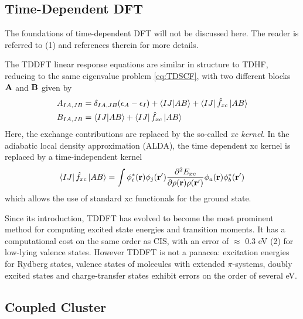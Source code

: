 \subsection{Time-Dependent DFT}

The foundations of time-dependent DFT  will not be discussed here. The reader is referred to (1) and references therein for more details. 

The TDDFT linear response equations are similar in structure to TDHF, reducing to the same eigenvalue problem \ref{eq:TDSCF}, with two different blocks $\mathbf{A}$ and $\mathbf{B}$ given by
\begin{align}
A_{IA,JB} &= \delta_{IA,JB} (\epsilon_A - \epsilon_I) + \bra{\smash{IJ}}\ket{\smash{AB}} +  \bra{\smash{IJ}}\hat{f}_{xc} \ket{\smash{AB}}  \\
B_{IA,JB} &= \bra{\smash{IJ}}\ket{\smash{AB}} + \bra{\smash{IJ}}\hat{f}_{xc} \ket{\smash{AB}}
\end{align}
\noindent Here, the exchange contributions are replaced by the so-called \emph{xc kernel}. In the adiabatic local density approximation (ALDA), the time dependent xc kernel is replaced by a time-independent kernel 
\begin{equation}
\bra{\smash{IJ}}\hat{f}_{xc} \ket{\smash{AB}} = \int \phi^*_i(\mathbf{r}) \phi_j(\mathbf{r}') \frac{\partial^2 E_{xc}}{\partial\rho(\mathbf{r})\rho(\mathbf{r}')} \phi_a (\mathbf{r}) \phi_b^*(\mathbf{r}')
\end{equation}
\noindent which allows the use of standard xc functionals for the ground state. 

Since its introduction, TDDFT has evolved to become the most prominent method for computing excited state energies and transition moments. It has a computational cost on the same order as CIS, with an error of $\approx$ 0.3 eV (2) for low-lying valence states. However TDDFT is not a panacea: excitation energies for Rydberg states, valence states of molecules with extended $\pi$-systems, doubly excited states and charge-transfer states exhibit errors on the order of several eV.



\subsection{Coupled Cluster}

